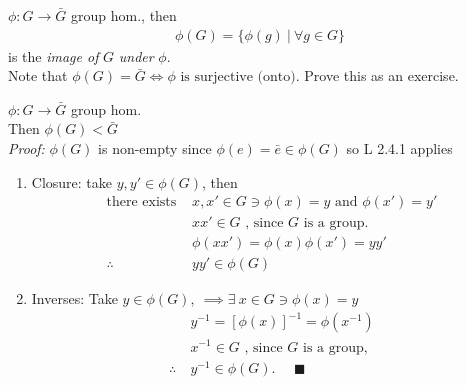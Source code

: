 \begin{definition}
$\phi: G\rightarrow \bar{G}$ group hom., then 
\begin{align}
    \phi(G)= \{\phi(g)\ | \ \forall g\in G\}\nonumber
\end{align}
is the \textit{image of }$G$ \textit{under} $\phi$.\steezybreak\\
Note that $\phi(G)=\bar{G}\iff \phi \text{ is surjective (onto)}$. Prove this as an exercise.
\end{definition}
\begin{proposition}
$\phi:G\rightarrow \bar{G}$ group hom.\steezybreak\\
Then $\phi(G)< \bar{G}$\steezybreak\\
\textit{Proof:} $\phi(G)$ is non-empty since $\phi(e)=\bar{e}\in \phi(G)$ so L 2.4.1 applies
\begin{enumerate}[label=\roman*)]
    \item Closure: take $y,y'\in \phi(G)$, then
    \begin{align}
        \text{there exists } &x,x'\in G \ni \phi(x)=y \text{ and } \phi(x')=y' \nonumber \\
        &xx'\in G \text{   , since } G \text{ is a group.} \nonumber \\
        &\phi(xx')=\phi(x)\phi(x')=yy' \nonumber \\
        \therefore \ &yy'\in \phi(G) \nonumber
    \end{align}
    \item Inverses: Take $y\in \phi(G), \ \implies \exists \ x\in G \ni \phi(x)=y$\\
    \begin{align}
        &y^{-1}=[\phi(x)]^{-1}=\phi(x^{-1})\nonumber\\
        &x^{-1}\in G \text{   , since } G \text{ is a group,} \nonumber \\
        \therefore \ &y^{-1}\in \phi(G). \ \ \ \ \ \ \blacksquare \nonumber
    \end{align}
\end{enumerate}
\end{proposition}

